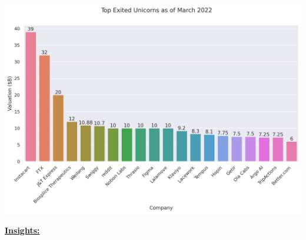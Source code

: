 \documentclass[a4paper,12pt]{article}
\begin{document}
\begin{center}
\includegraphics[width=.9\linewidth]{./.ob-jupyter/133c08bd485e5a0c21963dce921420f21661f265.png}
\label{}
\end{center}

\uline{\textbf{Insights:}}
\end{document}
